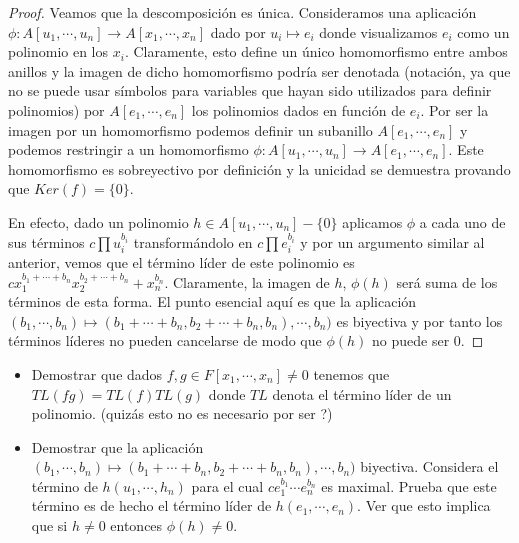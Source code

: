 \begin{proof}
Veamos que la descomposición es única. Consideramos una aplicación $\phi:A[u_1,\cdots,u_n] \to A[x_1,\cdots,x_n]$ dado por $u_i \mapsto e_i$ donde visualizamos $e_i$ como un polinomio en los $x_i$. Claramente, esto define un único homomorfismo entre ambos anillos y la imagen de dicho homomorfismo podría ser denotada (notación, ya que no se puede usar símbolos para variables que hayan sido utilizados para definir polinomios) por $A[e_1,\cdots,e_n]$ los polinomios dados en función de $e_i$. Por ser la imagen por un homomorfismo podemos definir un subanillo $A[e_1,\cdots,e_n]$ y podemos restringir a un homomorfismo $\phi:A[u_1,\cdots,u_n] \to A[e_1,\cdots,e_n]$. Este homomorfismo es sobreyectivo por definición y la unicidad se demuestra provando que $Ker(f) = \{0\}$. 

En efecto, dado un polinomio $h \in A[u_1,\cdots,u_n] - \{0\}$ aplicamos $\phi$ a cada uno de sus términos $c \prod u_i^{b_i}$ transformándolo en $c \prod e_i^{b_i}$ y por un argumento similar al anterior, vemos que el término líder de este polinomio es $cx_1^{b_1+\cdots+b_n}x_2^{b_2+\cdots+b_n}+x_n^{b_n}$. Claramente, la imagen de $h$, $\phi(h)$ será suma de los términos de esta forma. El punto esencial aquí es que la aplicación $(b_1,\cdots,b_n) \mapsto (b_1+\cdots+b_n,b_2+\cdots+b_n,b_n),\cdots,b_n)$ es biyectiva y por tanto los términos líderes no pueden cancelarse de modo que $\phi(h)$ no puede ser $0$. 


\end{proof}

\begin{exercise}
\begin{itemize}
\item Demostrar que dados $f,g \in F[x_1,\cdots,x_n] \neq 0$ tenemos que $TL(fg) = TL(f)TL(g)$ donde $TL$ denota el término líder de un polinomio. (quizás esto no es necesario por ser ?)
\item Demostrar que la aplicación $(b_1,\cdots,b_n) \mapsto (b_1+\cdots+b_n,b_2+\cdots+b_n,b_n),\cdots,b_n)$ biyectiva. Considera el término de $h(u_1,\cdots,h_n)$ para el cual $ce_1^{b_1}\cdots e_n^{b_n}$ es maximal. Prueba que este término es de hecho el término líder de $h(e_1,\cdots,e_n)$. Ver que esto implica que si $h \neq 0$ entonces $\phi(h) \neq 0$.  
\end{itemize}
\end{exercise}